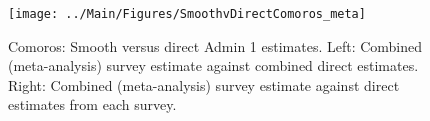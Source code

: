 \documentclass[12pt]{article}\usepackage[]{graphicx}\usepackage[]{color}
\newenvironment{knitrout}{}{} %
\begin{document}

\begin{knitrout}
\color{fgcolor}\begin{figure}[bht]

{\centering \texttt{[image: ../Main/Figures/SmoothvDirectComoros\_meta]} 

}

\caption[Comoros]{Comoros: Smooth versus direct Admin 1 estimates. Left: Combined (meta-analysis) survey estimate against combined direct estimates. Right: Combined (meta-analysis) survey estimate against direct estimates from each survey.}\label{fig:unnamed-chunk-63}
\end{figure}


\end{knitrout}
\end{document}
